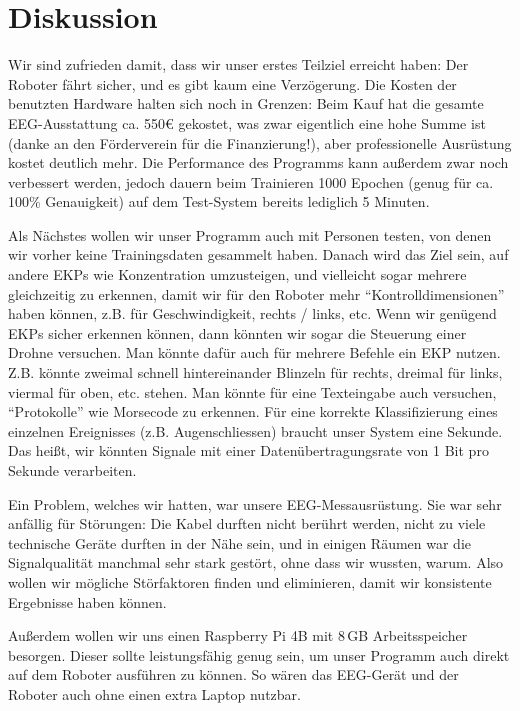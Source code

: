 \documentclass[11pt]{scrartcl}
\begin{document}
	\section{Diskussion}

	Wir sind zufrieden damit, dass wir unser erstes Teilziel erreicht haben: Der Roboter fährt sicher, und es gibt kaum eine Verzögerung. Die Kosten der benutzten Hardware halten sich noch in Grenzen: Beim Kauf hat die gesamte EEG-Ausstattung ca. 550€ gekostet, was zwar eigentlich eine hohe Summe ist (danke an den Förderverein für die Finanzierung!), aber professionelle Ausrüstung kostet deutlich mehr. Die Performance des Programms kann außerdem zwar noch verbessert werden, jedoch dauern beim Trainieren 1000 Epochen (genug für ca. 100\% Genauigkeit) auf dem Test-System bereits lediglich 5 Minuten. 

	Als Nächstes wollen wir unser Programm auch mit Personen testen, von denen wir vorher keine Trainingsdaten gesammelt haben.
%
	Danach wird das Ziel sein, auf andere EKPs wie Konzentration umzusteigen, und vielleicht sogar mehrere gleichzeitig zu erkennen, damit wir für den Roboter mehr \enquote{Kontrolldimensionen} haben können, z.B. für Geschwindigkeit, rechts / links, etc. Wenn wir genügend EKPs sicher erkennen können, dann könnten wir sogar die Steuerung einer Drohne versuchen. Man könnte dafür auch für mehrere Befehle ein EKP nutzen. Z.B. könnte zweimal schnell hintereinander Blinzeln für rechts, dreimal für links, viermal für oben, etc. stehen. Man könnte für eine Texteingabe auch versuchen, \enquote{Protokolle} wie Morsecode zu erkennen. Für eine korrekte Klassifizierung eines einzelnen Ereignisses (z.B. Augenschliessen) braucht unser System eine Sekunde. Das heißt, wir könnten Signale mit einer Datenübertragungsrate von 1 Bit pro Sekunde verarbeiten.

	Ein Problem, welches wir hatten, war unsere EEG-Messausrüstung. Sie war sehr anfällig für Störungen: Die Kabel durften nicht berührt werden, nicht zu viele technische Geräte durften in der Nähe sein, und in einigen Räumen war die Signalqualität manchmal sehr stark gestört, ohne dass wir wussten, warum. Also wollen wir mögliche Störfaktoren finden und eliminieren, damit wir konsistente Ergebnisse haben können.

	Außerdem wollen wir uns einen Raspberry Pi 4B mit 8\,GB Arbeitsspeicher besorgen. Dieser sollte leistungsfähig genug sein, um unser Programm auch direkt auf dem Roboter ausführen zu können. So wären das EEG-Gerät und der Roboter auch ohne einen extra Laptop nutzbar.
\end{document}
